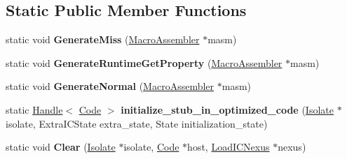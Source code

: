 \subsection*{Static Public Member Functions}
\begin{DoxyCompactItemize}
\item 
static void {\bfseries Generate\+Miss} (\hyperlink{classv8_1_1internal_1_1_macro_assembler}{Macro\+Assembler} $\ast$masm)\hypertarget{classv8_1_1internal_1_1_load_i_c_ace4b24c3313ec0702f2e177db1bfee92}{}\label{classv8_1_1internal_1_1_load_i_c_ace4b24c3313ec0702f2e177db1bfee92}

\item 
static void {\bfseries Generate\+Runtime\+Get\+Property} (\hyperlink{classv8_1_1internal_1_1_macro_assembler}{Macro\+Assembler} $\ast$masm)\hypertarget{classv8_1_1internal_1_1_load_i_c_a524c61294db8703efaedb89710479fdc}{}\label{classv8_1_1internal_1_1_load_i_c_a524c61294db8703efaedb89710479fdc}

\item 
static void {\bfseries Generate\+Normal} (\hyperlink{classv8_1_1internal_1_1_macro_assembler}{Macro\+Assembler} $\ast$masm)\hypertarget{classv8_1_1internal_1_1_load_i_c_a283978f73ab60ad618873a3308d81817}{}\label{classv8_1_1internal_1_1_load_i_c_a283978f73ab60ad618873a3308d81817}

\item 
static \hyperlink{classv8_1_1internal_1_1_handle}{Handle}$<$ \hyperlink{classv8_1_1internal_1_1_code}{Code} $>$ {\bfseries initialize\+\_\+stub\+\_\+in\+\_\+optimized\+\_\+code} (\hyperlink{classv8_1_1internal_1_1_isolate}{Isolate} $\ast$isolate, Extra\+I\+C\+State extra\+\_\+state, State initialization\+\_\+state)\hypertarget{classv8_1_1internal_1_1_load_i_c_a9a936d01d7692a15b63dc17e91b8f3ad}{}\label{classv8_1_1internal_1_1_load_i_c_a9a936d01d7692a15b63dc17e91b8f3ad}

\item 
static void {\bfseries Clear} (\hyperlink{classv8_1_1internal_1_1_isolate}{Isolate} $\ast$isolate, \hyperlink{classv8_1_1internal_1_1_code}{Code} $\ast$host, \hyperlink{classv8_1_1internal_1_1_load_i_c_nexus}{Load\+I\+C\+Nexus} $\ast$nexus)\hypertarget{classv8_1_1internal_1_1_load_i_c_a14ca3cc4963e6ba2cd1af10fd7b8fdd9}{}\label{classv8_1_1internal_1_1_load_i_c_a14ca3cc4963e6ba2cd1af10fd7b8fdd9}

\end{DoxyCompactItemize}
